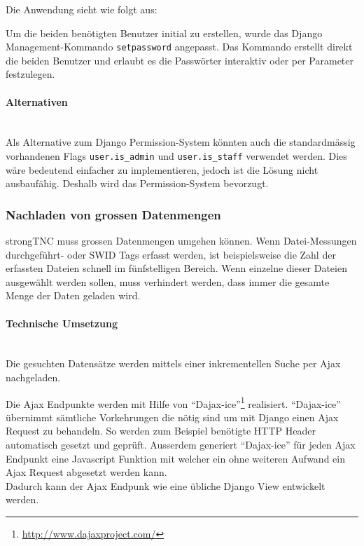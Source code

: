 Die Anwendung sieht wie folgt aus:


Um die beiden benötigten Benutzer initial zu erstellen, wurde das Django
Management-Kommando \texttt{setpassword} angepasst. Das Kommando erstellt direkt
die beiden Benutzer und erlaubt es die Passwörter interaktiv oder per Parameter
festzulegen.

\paragraph{Alternativen} \hspace{0px} \\
Als Alternative zum Django Permission-System könnten auch die standardmässig
vorhandenen Flags \texttt{user.is\_admin} und \texttt{user.is\_staff} verwendet
werden. Dies wäre bedeutend einfacher zu implementieren, jedoch ist die Lösung
nicht ausbaufähig. Deshalb wird das Permission-System bevorzugt.

\subsubsection{Nachladen von grossen Datenmengen}
strongTNC muss grossen Datenmengen umgehen können. Wenn Datei-Messungen
durchgeführt- oder SWID Tags erfasst werden, ist beispielsweise die Zahl der
erfassten Dateien schnell im fünfstelligen Bereich. Wenn einzelne dieser Dateien
ausgewählt werden sollen, muss verhindert werden, dass immer die gesamte Menge
der Daten geladen wird.

\paragraph{Technische Umsetzung} \hspace{0pt} \\
Die gesuchten Datensätze werden mittels einer inkrementellen Suche per Ajax
nachgeladen.

Die Ajax Endpunkte werden mit Hilfe von
\enquote{Dajax-ice}\footnote{\url{http://www.dajaxproject.com/}} realisiert.
\enquote{Dajax-ice} übernimmt sämtliche Vorkehrungen die nötig sind um mit Django
einen Ajax Request zu behandeln. So werden zum Beispiel benötigte HTTP Header
automatisch gesetzt und geprüft. Ausserdem generiert \enquote{Dajax-ice} für
jeden Ajax Endpunkt eine Javascript Funktion mit welcher ein ohne weiteren
Aufwand ein Ajax Request abgesetzt werden kann.\\
Dadurch kann der Ajax Endpunk wie eine übliche Django View entwickelt werden.

